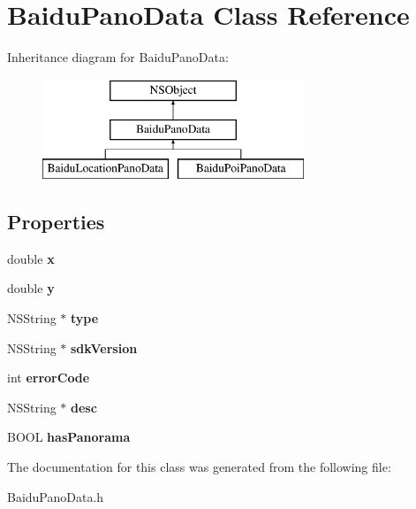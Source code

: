 \hypertarget{interface_baidu_pano_data}{}\section{Baidu\+Pano\+Data Class Reference}
\label{interface_baidu_pano_data}
Inheritance diagram for Baidu\+Pano\+Data\+:\begin{figure}[H]
\begin{center}
\leavevmode
\includegraphics[height=3.000000cm]{interface_baidu_pano_data}
\end{center}
\end{figure}
\subsection*{Properties}
\begin{DoxyCompactItemize}
\item 
\hypertarget{interface_baidu_pano_data_a9b2b0a541dedae97020c705d05e57747}{}double {\bfseries x}\label{interface_baidu_pano_data_a9b2b0a541dedae97020c705d05e57747}

\item 
\hypertarget{interface_baidu_pano_data_a76ef908e3434e9d9a27d637cfdace2a2}{}double {\bfseries y}\label{interface_baidu_pano_data_a76ef908e3434e9d9a27d637cfdace2a2}

\item 
\hypertarget{interface_baidu_pano_data_ab18ba158af453b7083e2a08320da8c98}{}N\+S\+String $\ast$ {\bfseries type}\label{interface_baidu_pano_data_ab18ba158af453b7083e2a08320da8c98}

\item 
\hypertarget{interface_baidu_pano_data_a5d5be4b96ec81d950cd436032e37902e}{}N\+S\+String $\ast$ {\bfseries sdk\+Version}\label{interface_baidu_pano_data_a5d5be4b96ec81d950cd436032e37902e}

\item 
\hypertarget{interface_baidu_pano_data_ad7897e40c162c273b737074101fa8ead}{}int {\bfseries error\+Code}\label{interface_baidu_pano_data_ad7897e40c162c273b737074101fa8ead}

\item 
\hypertarget{interface_baidu_pano_data_a8a69f477f14610552d6457612e1c6a3a}{}N\+S\+String $\ast$ {\bfseries desc}\label{interface_baidu_pano_data_a8a69f477f14610552d6457612e1c6a3a}

\item 
\hypertarget{interface_baidu_pano_data_a4827cdb654418114403d803f29e3489a}{}B\+O\+O\+L {\bfseries has\+Panorama}\label{interface_baidu_pano_data_a4827cdb654418114403d803f29e3489a}

\end{DoxyCompactItemize}


The documentation for this class was generated from the following file\+:\begin{DoxyCompactItemize}
\item 
Baidu\+Pano\+Data.\+h\end{DoxyCompactItemize}
